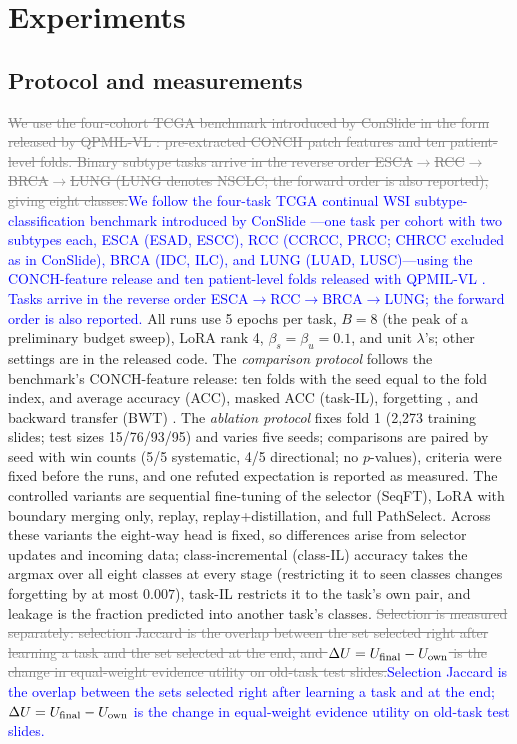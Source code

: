 \documentclass{article}
\newif\ifmarkup \markuptrue
\newcommand{\del}[1]{\ifmarkup\textcolor{gray}{\sout{#1}}\fi}
\newcommand{\ins}[1]{\ifmarkup\textcolor{blue}{#1}\else#1\fi}
\newcommand{\rep}[2]{\del{#1}\ins{#2}}
\begin{document}
\section{Experiments}
\label{sec:exp}

\subsection{Protocol and measurements}

\rep{We use the four-cohort TCGA benchmark introduced by ConSlide \cite{huang2023conslide} in the form released by QPMIL-VL \cite{gou2025qpmil}: pre-extracted CONCH patch features and ten patient-level folds. Binary subtype tasks arrive in the reverse order ESCA$\rightarrow$RCC$\rightarrow$BRCA$\rightarrow$LUNG (LUNG denotes NSCLC; the forward order is also reported), giving eight classes.}{We follow the four-task TCGA continual WSI subtype-classification benchmark introduced by ConSlide \cite{huang2023conslide}---one task per cohort with two subtypes each, ESCA (ESAD, ESCC), RCC (CCRCC, PRCC; CHRCC excluded as in ConSlide), BRCA (IDC, ILC), and LUNG (LUAD, LUSC)---using the CONCH-feature release and ten patient-level folds released with QPMIL-VL \cite{gou2025qpmil}. Tasks arrive in the reverse order ESCA$\rightarrow$RCC$\rightarrow$BRCA$\rightarrow$LUNG; the forward order is also reported.} All runs use 5 epochs per task, $B=8$ (the peak of a preliminary budget sweep), LoRA rank 4, $\beta_s{=}\beta_u{=}0.1$, and unit $\lambda$'s; other settings are in the released code. The \emph{comparison protocol} follows the benchmark's CONCH-feature release: ten folds with the seed equal to the fold index, and average accuracy (ACC), masked ACC (task-IL), forgetting \cite{chaudhry2018rwalk}, and backward transfer (BWT) \cite{lopezpaz2017gem}. The \emph{ablation protocol} fixes fold 1 (2,273 training slides; test sizes 15/76/93/95) and varies five seeds; comparisons are paired by seed with win counts (5/5 systematic, 4/5 directional; no $p$-values), criteria were fixed before the runs, and one refuted expectation is reported as measured. The controlled variants are sequential fine-tuning of the selector (SeqFT), LoRA with boundary merging only, replay, replay+distillation, and full PathSelect. Across these variants the eight-way head is fixed, so differences arise from selector updates and incoming data; class-incremental (class-IL) accuracy takes the argmax over all eight classes at every stage (restricting it to seen classes changes forgetting by at most $0.007$), task-IL restricts it to the task's own pair, and leakage is the fraction predicted into another task's classes. \rep{Selection is measured separately: selection Jaccard is the overlap between the set selected right after learning a task and the set selected at the end, and $\Delta U=U_{\rm final}-U_{\rm own}$ is the change in equal-weight evidence utility on old-task test slides.}{Selection Jaccard is the overlap between the sets selected right after learning a task and at the end; $\Delta U=U_{\rm final}-U_{\rm own}$ is the change in equal-weight evidence utility on old-task test slides.}
\end{document}

